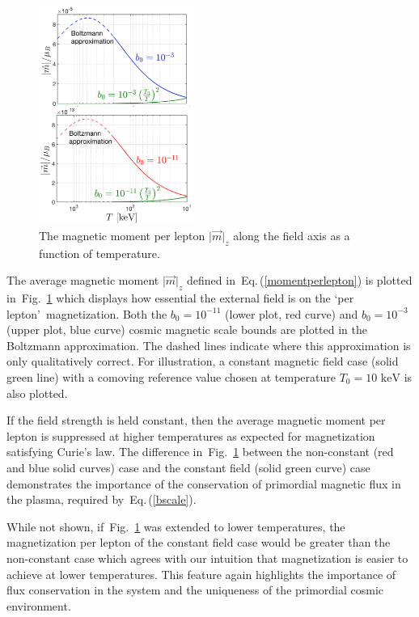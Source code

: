 \documentclass[aps,prd,floatfix,reprint]{revtex4-2}
\newcommand*{\keV}{\text{ keV}}
\newcommand{\req}[1]{Eq.\,(\ref{#1})}
\newcommand{\rf}[1]{Fig.~{\ref{#1}}}
\begin{document}
\begin{figure}[ht]
 \centering
 \includegraphics[width=0.45\textwidth]{plots/NewMagnetizationDensity004_Boltz.png}
 \caption{The magnetic moment per lepton $\vert\vec{m}\vert_{z}$ along the field axis as a function of temperature.}
 \label{fig:momentperlepton}
\end{figure}

The average magnetic moment $\vert\vec{m}\vert_{z}$ defined in~\req{momentperlepton} is plotted in~\rf{fig:momentperlepton} which displays how essential the external field is on the \lq per lepton\rq\ magnetization. Both the $b_{0}=10^{-11}$ (lower plot, red curve) and $b_{0}=10^{-3}$ (upper plot, blue curve) cosmic magnetic scale bounds are plotted in the Boltzmann approximation. The dashed lines indicate where this approximation is only qualitatively correct. For illustration, a constant magnetic field case (solid green line) with a comoving reference value chosen at temperature $T_{0}=10\keV$ is also plotted.

If the field strength is held constant, then the average magnetic moment per lepton is suppressed at higher temperatures as expected for magnetization satisfying Curie's law. The difference in~\rf{fig:momentperlepton} between the non-constant (red and blue solid curves) case and the constant field (solid green curve) case demonstrates the importance of the conservation of primordial magnetic flux in the plasma, required by~\req{bscale}.

While not shown, if~\rf{fig:momentperlepton} was extended to lower temperatures, the magnetization per lepton of the constant field case would be greater than the non-constant case which agrees with our intuition that magnetization is easier to achieve at lower temperatures. This feature again highlights the importance of flux conservation in the system and the uniqueness of the primordial cosmic environment.
\end{document}
